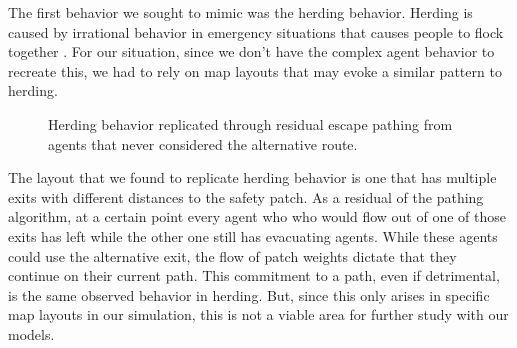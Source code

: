\documentclass[12pt,letterpaper]{article}
\begin{document}
The first behavior we sought to mimic was the herding behavior.  Herding is caused by irrational behavior in emergency situations that causes people to flock together \cite{almeidaCrowdSimulationModeling2013}.  For our situation, since we don't have the complex agent behavior to recreate this, we had to rely on map layouts that may evoke a similar pattern to herding.

\begin{figure}[H]
  \centering
  \hfill
  \caption{Herding behavior replicated through residual escape pathing from agents that never considered the alternative route.}
\end{figure}

The layout that we found to replicate herding behavior is one that has multiple exits with different distances to the safety patch.  As a residual of the pathing algorithm, at a certain point every agent who who would flow out of one of those exits has left while the other one still has evacuating agents.  While these agents could use the alternative exit, the flow of patch weights dictate that they continue on their current path.  This commitment to a path, even if detrimental, is the same observed behavior in herding.  But, since this only arises in specific map layouts in our simulation, this is not a viable area for further study with our models. 
\end{document}
